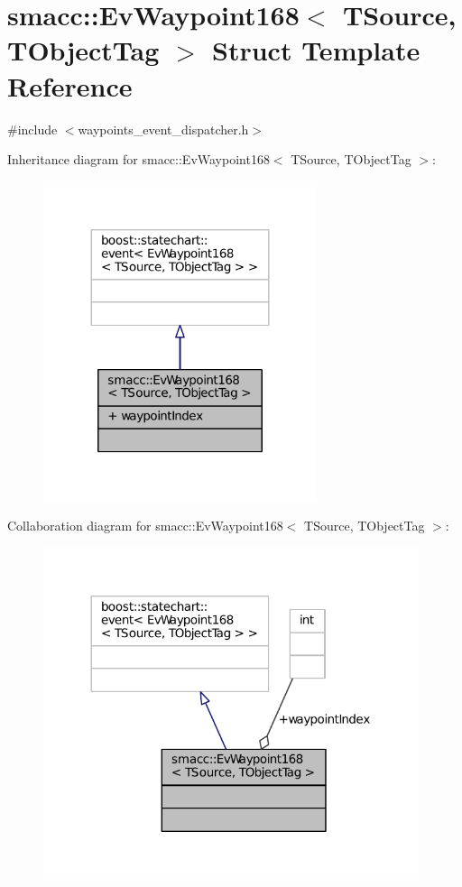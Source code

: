 \hypertarget{structsmacc_1_1EvWaypoint168}{}\section{smacc\+:\+:Ev\+Waypoint168$<$ T\+Source, T\+Object\+Tag $>$ Struct Template Reference}
\label{structsmacc_1_1EvWaypoint168}


{\ttfamily \#include $<$waypoints\+\_\+event\+\_\+dispatcher.\+h$>$}



Inheritance diagram for smacc\+:\+:Ev\+Waypoint168$<$ T\+Source, T\+Object\+Tag $>$\+:
\nopagebreak
\begin{figure}[H]
\begin{center}
\leavevmode
\includegraphics[width=227pt]{structsmacc_1_1EvWaypoint168__inherit__graph}
\end{center}
\end{figure}


Collaboration diagram for smacc\+:\+:Ev\+Waypoint168$<$ T\+Source, T\+Object\+Tag $>$\+:
\nopagebreak
\begin{figure}[H]
\begin{center}
\leavevmode
\includegraphics[width=312pt]{structsmacc_1_1EvWaypoint168__coll__graph}
\end{center}
\end{figure}
